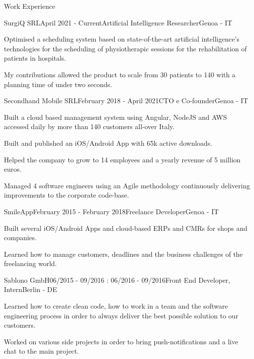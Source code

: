 \documentclass{resume} %
\begin{document}

\begin{rSection}{Work Experience}

\begin{rSubsection}{SurgiQ SRL}{April 2021 - Current}{Artificial Intelligence Researcher}{Genoa - IT}
\item Optimised a scheduling system based on state-of-the-art artificial intelligence’s technologies for the scheduling of physiotherapic sessions for the rehabilitation of patients in hospitals.
\item My contributions allowed the product to scale from 30 patients to 140 with a planning time of under two seconds.
\end{rSubsection}

\begin{rSubsection}{Secondhand Mobile SRL}{February 2018 - April 2021}{CTO e Co-founder}{Genoa - IT}
\item Built a cloud based management system using Angular, NodeJS and AWS accessed daily by more than 140 customers all-over Italy.
\item Built and published an iOS/Android App with 65k active downloads.
\item Helped the company to grow to 14 employees and a yearly revenue of 5 million euros.
\item Managed 4 software engineers using an Agile methodology continuously delivering improvements to the corporate code-base.
\end{rSubsection}


\begin{rSubsection}{SmileApp}{February 2015 - February 2018}{Freelance Developer}{Genoa - IT}
\item Built several iOS/Android Apps and cloud-based ERPs and CMRs for shops and companies.
\item Learned how to manage customers, deadlines and the business challenges of the freelancing world.
\end{rSubsection}


\begin{rSubsection}{Sablono GmbH}{06/2015 - 09/2016 : 06/2016 - 09/2016}{Front End Developer, Intern}{Berlin - DE}
\item Learned how to create clean code, how to work in a team and the software engineering process in order to always deliver the best possible solution to our customers.
\item Worked on various side projects in order to bring push-notifications and a live chat to the main project.
\end{rSubsection}

\end{rSection}
\end{document}
